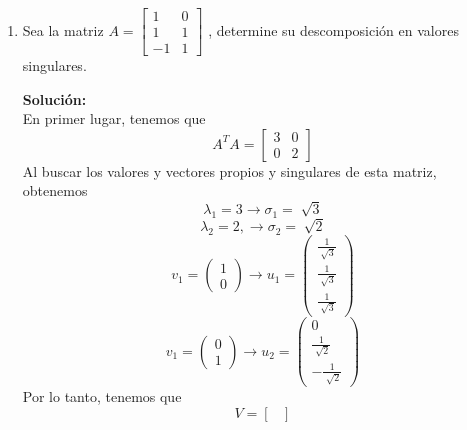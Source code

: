 \documentclass[12pt]{article}
\newenvironment{solucion}
{\begin{mdframed}[backgroundcolor=black!10]
		{\bf Solución:}\\
	}
	{
	\end{mdframed}
}
\newenvironment{preguntas}
{\begin{enumerate}\itemsep12pt
	}
	{
	\end{enumerate}
}
\newcommand{\ra}{\rightarrow}
\begin{document}
\begin{preguntas}
\begin{solucion}
$$\begin{bmatrix}
		\dfrac{3}{\sqrt[]{10}} & \dfrac{1}{\sqrt[]{10}} \\\\
		\dfrac{1}{\sqrt[]{10}} & \dfrac{-3}{\sqrt[]{10}}
		\end{bmatrix} 
		\begin{bmatrix}
		6 \ \sqrt[]{10} & 0 & 0\\
		0 & 3 \ \sqrt[]{10} & 0
		\end{bmatrix}
		\begin{bmatrix}
		\dfrac{1}{3} & \dfrac{2}{3} & \dfrac{2}{3} \\\\
		-\dfrac{2}{3} & -\dfrac{1}{3} & \dfrac{2}{3}  \\\\
		\dfrac{2}{3} & -\dfrac{2}{3}  & \dfrac{1}{3} 
		\end{bmatrix}
		$$
\end{solucion}
\item Sea la matriz
	$A = \begin{bmatrix}
	1 & 0 \\1 & 1 \\
	-1 & 1
	\end{bmatrix}$
	, determine su descomposición en valores singulares.
\begin{solucion}
En primer lugar, tenemos que
$$A^TA = \begin{bmatrix}
3 & 0 \\
0 & 2
\end{bmatrix}$$
Al buscar los valores y vectores propios y singulares de esta matriz, obtenemos
$$\lambda_1 = 3 \ra \sigma_1 = \sqrt[]{3}$$
$$\lambda_2 = 2, \ra \sigma_2 = \sqrt[]{2}$$
$$v_1 = \begin{pmatrix}
1 \\ 0
\end{pmatrix} \ra u_1 = \begin{pmatrix}
\frac{1}{\sqrt[]{3}} \\
\frac{1}{\sqrt[]{3}} \\
\frac{1}{\sqrt[]{3}}
\end{pmatrix} $$
$$v_1 = \begin{pmatrix}
0 \\ 1
\end{pmatrix} \ra u_2 = \begin{pmatrix}
0 \\
\frac{1}{\sqrt[]{2}} \\
-\frac{1}{\sqrt[]{2}}
\end{pmatrix}$$
Por lo tanto, tenemos que
$$V = \begin{bmatrix}

\end{bmatrix}$$
\end{solucion}
\end{preguntas}
\end{document}
